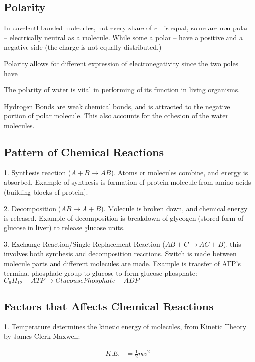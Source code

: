 \documentclass[12pt, UTF8]{article}
\begin{document}
	\subsection*{Polarity}
	
	In covelentl bonded molecules, not every share of $e^{-}$ is equal, some are non polar -- electrically neutral as a molecule. While some a polar -- have a positive and a negative side (the charge is not equally distributed.)
	
	Polarity allows for different expression of electronegativity since the two poles have
	
	The polarity of water is vital in performing of its function in living organisms.
	
	Hydrogen Bonds are weak chemical bonds, and is attracted to the negative portion of polar molecule. This also accounts for the cohesion of the water molecules.
	
	\subsection*{Pattern of Chemical Reactions}
	
	1. Synthesis reaction ($A + B \longrightarrow AB$). Atoms or molecules combine, and energy is absorbed. Example of synthesis is formation of protein molecule from amino acids (building blocks of protein).
	
	2. Decomposition ($AB \longrightarrow A + B$). Molecule is broken down, and chemical energy is released. Example of decomposition is breakdown of glycogen (stored form of glucose in liver) to release glucose units.
	
	3. Exchange Reaction/Single Replacement Reaction ($AB + C \longrightarrow AC + B$), this involves both synthesis and decomposition reactions. Switch is made between molecule parts and different molecules are made. Example is transfer of ATP's terminal phosphate group to glucose to form glucose phosphate: $C_{6}H_{12} + ATP \longrightarrow Glucouse Phosphate + ADP$
	
	\subsection*{Factors that Affects Chemical Reactions}
	
	1. Temperature determines the kinetic energy of molecules, from Kinetic Theory by James Clerk Maxwell:
	
	\begin{align}
		K.E. &= \frac{1}{2}mv^{2} 
	\end{align}
	
\end{document}
